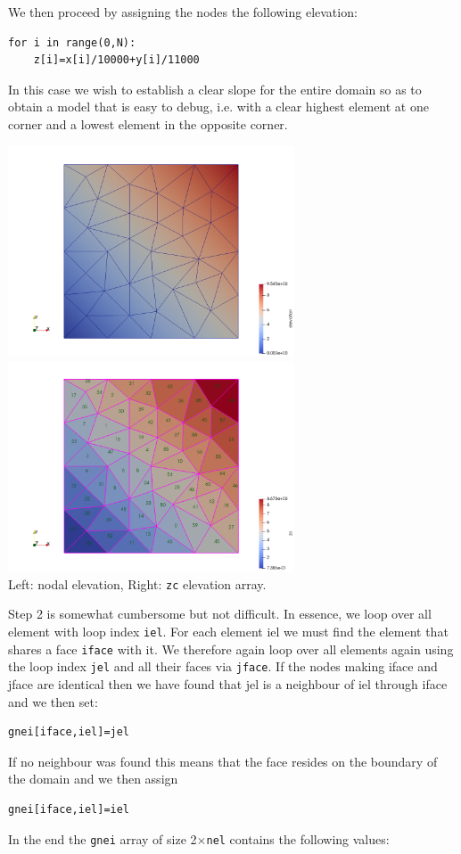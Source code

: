 We then proceed by assigning the nodes the following elevation:
\begin{lstlisting}
for i in range(0,N):
    z[i]=x[i]/10000+y[i]/11000 
\end{lstlisting}
In this case we wish to establish a clear slope for the entire domain 
so as to obtain a model that is easy to debug, i.e. with a clear 
highest element at one corner and a lowest element in the opposite corner.

\begin{center}
\includegraphics[width=8.5cm]{python_codes/fieldstone_140/images/mesh5}
\includegraphics[width=8.5cm]{python_codes/fieldstone_140/images/mesh6}\\
{\captionfont Left: nodal elevation, Right: {\tt zc} elevation array.}
\end{center}

Step 2 is somewhat cumbersome but not difficult. In essence, we loop over all element with 
loop index {\tt iel}. 
For each element iel we must find the element that shares a face {\tt iface} with it. 
We therefore again loop over all elements again using the loop index {\tt jel} and all their 
faces via {\tt jface}. If the nodes making iface and jface are identical then we have found that 
jel is a neighbour of iel through iface and we then set:
\begin{lstlisting}
gnei[iface,iel]=jel
\end{lstlisting}
If no neighbour was found this means that the face resides on the boundary of the domain 
and we then assign
\begin{lstlisting}
gnei[iface,iel]=iel
\end{lstlisting}
In the end the {\tt gnei} array of size 2$\times${\tt nel} contains the following values:

